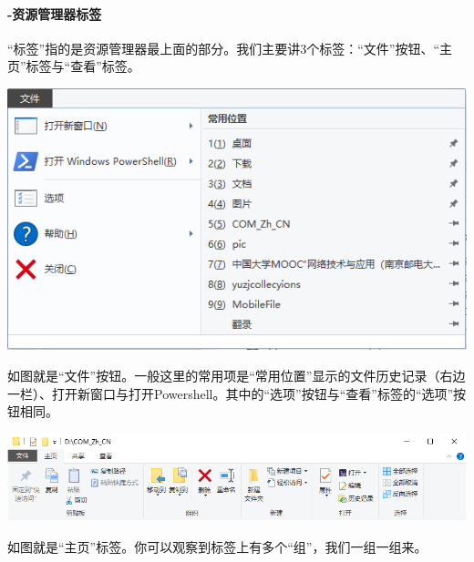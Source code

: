 \paragraph{-资源管理器标签}
“标签”指的是资源管理器最上面的部分。我们主要讲3个标签：“文件”按钮、“主页”标签与“查看”标签。
\begin{center}
	\includegraphics[scale=0.4]{pic/Exp4}
\end{center} \par
如图就是“文件”按钮。一般这里的常用项是“常用位置”显示的文件历史记录（右边一栏）、打开新窗口与打开Powershell。其中的“选项”按钮与“查看”标签的“选项”按钮相同。
\begin{center}
	\includegraphics[scale=0.4]{pic/Exp9}
\end{center} \par
如图就是“主页”标签。你可以观察到标签上有多个“组”，我们一组一组来。\par
